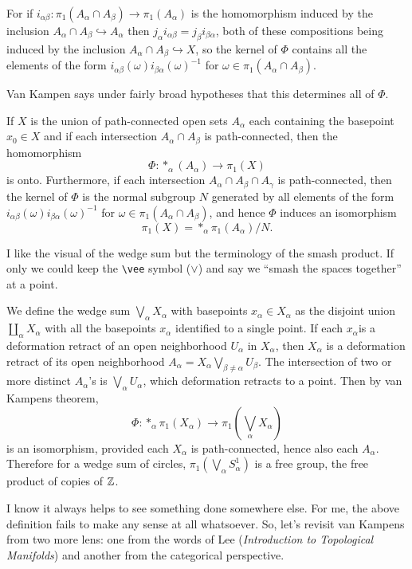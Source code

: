 For if $i_{\alpha\beta} \colon  \pi_1(A_{\alpha}\cap A_{\beta}) \to \pi_1(A_{\alpha})$ is the homomorphism induced by the inclusion $A_{\alpha}\cap A_{\beta}\hookrightarrow A_{\alpha}$ then $j_{\alpha}i_{\alpha\beta}=j_{\beta}i_{\beta\alpha}$, both of these compositions being induced by the inclusion $A_{\alpha}\cap A_{\beta}\hookrightarrow X$, so the kernel of $\Phi$ contains all the elements of the form $i_{\alpha\beta}(\omega)i_{\beta\alpha}(\omega)^{-1}$ for $\omega \in \pi_1(A_{\alpha}\cap A_{\beta})$. 

Van Kampen says under fairly broad hypotheses that this determines all of $\Phi$.

\begin{theorem}
    If $X$ is the union of path-connected open sets $A_{\alpha}$ each containing the basepoint $x_0\in X$ and if each intersection $A_{\alpha}\cap A_{\beta}$ is path-connected, then the homomorphism \[
        \Phi \colon *_{\alpha}(A_{\alpha}) \to \pi_1(X)
    \] is onto. Furthermore, if each intersection $A_{\alpha}\cap A_{\beta}\cap A_{\gamma}$ is path-connected, then the kernel of $\Phi$ is the normal subgroup $N$ generated by all elements of the form $i_{\alpha\beta}(\omega)i_{\beta\alpha}(\omega)^{-1}$ for $\omega \in \pi_1(A_{\alpha}\cap A_{\beta})$, and hence $\Phi$ induces an isomorphism \[
    \pi_1(X)=*_{\alpha}\pi_1(A_{\alpha}) /N.
    \] 
\end{theorem}
\begin{example}
    I like the visual of the wedge sum but the terminology of the smash product. If only we could keep the \texttt{\textbackslash vee} symbol ($\vee$) and say we ``smash the spaces together'' at a point. 

    We define the wedge sum $\bigvee_{\alpha}X_{\alpha}$ with basepoints $x_{\alpha}\in X_{\alpha}$ as the disjoint union $\amalg_{\alpha}X_{\alpha}$ with all the basepoints $x_{\alpha}$ identified to a single point. If each $x_{\alpha}$is a deformation retract of an open neighborhood $U_{\alpha }$ in $X_{\alpha }$, then $X_{\alpha }$ is a deformation retract of its open neighborhood $A_{\alpha }=X_{\alpha }\bigvee_{\beta\neq\alpha }U_{\beta}$. The intersection of two or more distinct $A_{\alpha }$'s is $\bigvee_{\alpha }U_{\alpha }$, which deformation retracts to a point. Then by van Kampens theorem, \[
        \Phi \colon *_{\alpha }\pi_1(X_{\alpha }) \to \pi_1(\bigvee_{\alpha }X_{\alpha })
    \] is an isomorphism, provided each $X_{\alpha }$ is path-connected, hence also each $A_{\alpha }$. Therefore for a wedge sum of circles, $\pi_1(\bigvee_{\alpha }S_{\alpha }^{1})$ is a free group, the free product of copies of $\mathbb{Z}$.
\end{example}
\orbreak
I know it always helps to see something done somewhere else. For me, the above definition fails to make any sense at all whatsoever. So, let's revisit van Kampens from two more lens: one from the words of Lee (\emph{Introduction to Topological Manifolds}) and another from the categorical perspective.
